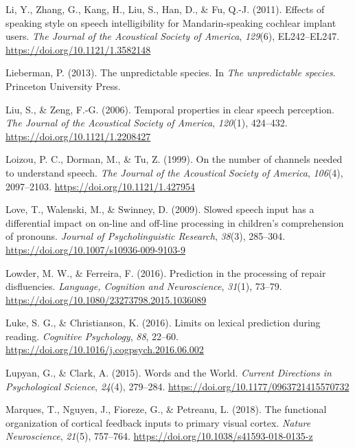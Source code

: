 \documentclass[a4paper, nobind]{templates/ociamthesis}
\newlength{\cslhangindent}
\newenvironment{CSLReferences}[2] %
 {%
  \setlength{\parindent}{0pt}
  \ifodd #1
  \let\oldpar\par
  \def\par{\hangindent=\cslhangindent\oldpar}
  \fi
  \setlength{\parskip}{1mm}
  \setlength{\baselineskip}{6mm}
 }%
 {}
\begin{document}
\begin{CSLReferences}{1}{0}
\leavevmode{}%
Li, Y., Zhang, G., Kang, H., Liu, S., Han, D., \& Fu, Q.-J. (2011). {Effects of speaking style on speech intelligibility for Mandarin-speaking cochlear implant users}. \emph{The Journal of the Acoustical Society of America}, \emph{129}(6), EL242--EL247. \url{https://doi.org/10.1121/1.3582148}

\leavevmode{}%
Lieberman, P. (2013). The unpredictable species. In \emph{The unpredictable species}. Princeton University Press.

\leavevmode{}%
Liu, S., \& Zeng, F.-G. (2006). {Temporal properties in clear speech perception}. \emph{The Journal of the Acoustical Society of America}, \emph{120}(1), 424--432. \url{https://doi.org/10.1121/1.2208427}

\leavevmode{}%
Loizou, P. C., Dorman, M., \& Tu, Z. (1999). On the number of channels needed to understand speech. \emph{The Journal of the Acoustical Society of America}, \emph{106}(4), 2097--2103. \url{https://doi.org/10.1121/1.427954}

\leavevmode{}%
Love, T., Walenski, M., \& Swinney, D. (2009). {Slowed speech input has a differential impact on on-line and off-line processing in children's comprehension of pronouns}. \emph{Journal of Psycholinguistic Research}, \emph{38}(3), 285--304. \url{https://doi.org/10.1007/s10936-009-9103-9}

\leavevmode{}%
Lowder, M. W., \& Ferreira, F. (2016). {Prediction in the processing of repair disfluencies}. \emph{Language, Cognition and Neuroscience}, \emph{31}(1), 73--79. \url{https://doi.org/10.1080/23273798.2015.1036089}

\leavevmode{}%
Luke, S. G., \& Christianson, K. (2016). Limits on lexical prediction during reading. \emph{Cognitive Psychology}, \emph{88}, 22--60. \url{https://doi.org/10.1016/j.cogpsych.2016.06.002}

\leavevmode{}%
Lupyan, G., \& Clark, A. (2015). Words and the World. \emph{Current Directions in Psychological Science}, \emph{24}(4), 279--284. \url{https://doi.org/10.1177/0963721415570732}

\leavevmode{}%
Marques, T., Nguyen, J., Fioreze, G., \& Petreanu, L. (2018). The functional organization of cortical feedback inputs to primary visual cortex. \emph{Nature Neuroscience}, \emph{21}(5), 757--764. \url{https://doi.org/10.1038/s41593-018-0135-z}


\end{CSLReferences}
\end{document}
